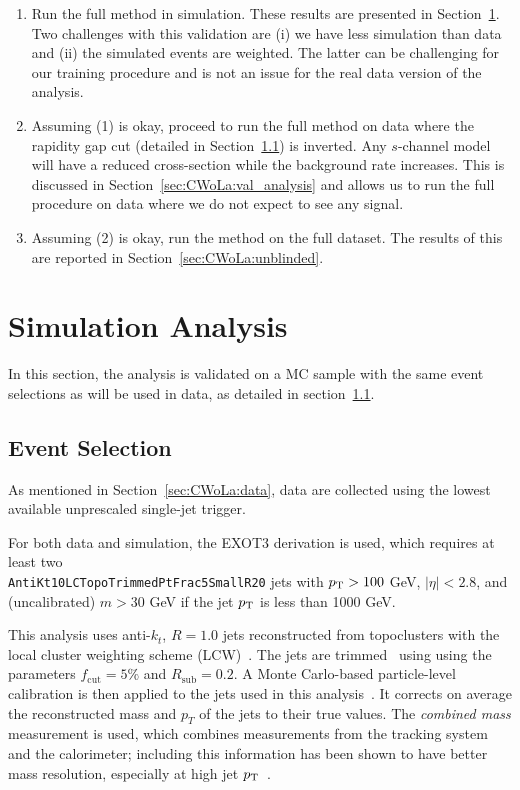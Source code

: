 \begin{enumerate}
\item Run the full method in simulation.  These results are presented in Section~\ref{sec:CWoLa:simulation_analysis}.  Two challenges with this validation are (i) we have less simulation than data and (ii) the simulated events are weighted.  The latter can be challenging for our training procedure and is not an issue for the real data version of the analysis. 
\item Assuming (1) is okay, proceed to run the full method on data where the rapidity gap cut (detailed in Section~\ref{sec:CWoLa:eventselection}) is inverted.  Any $s$-channel model will have a reduced cross-section while the background rate increases.  This is discussed in Section~\ref{sec:CWoLa:val_analysis} and allows us to run the full procedure on data where we do not expect to see any signal.
\item Assuming (2) is okay, run the method on the full dataset.  The results of this are reported in Section~\ref{sec:CWoLa:unblinded}.
\end{enumerate}

\clearpage

\section{Simulation Analysis}
\label{sec:CWoLa:simulation_analysis}
In this section, the analysis is validated on a MC sample with the same event selections as will be used in data, as detailed in section~\ref{sec:CWoLa:eventselection}.

\subsection{Event Selection}
\label{sec:CWoLa:eventselection}
As mentioned in Section~\ref{sec:CWoLa:data}, data are collected using the lowest available unprescaled single-jet trigger.

For both data and simulation, the EXOT3 derivation is used, which requires at least two \\ \texttt{AntiKt10LCTopoTrimmedPtFrac5SmallR20} jets with $p_{\text{T}}>100$ GeV, $|\eta|<2.8$, and (uncalibrated) $m>30$ GeV if the jet $p_{\text{T}}$ is less than 1000 GeV.

This analysis uses anti-$k_t$, $R=1.0$ jets reconstructed from topoclusters with the local cluster weighting scheme (LCW)~\cite{Aad:2016upy}. The jets are trimmed~\cite{Krohn:2009th} using using the parameters $f_\text{cut} = 5\%$ and $R_\text{sub} = 0.2$.
A Monte Carlo-based particle-level calibration is then applied to the jets used in this analysis~\cite{Aaboud:2018kfi}.
It corrects on average the reconstructed mass and $p_T$ of the jets to their true values.
The \textit{combined mass} measurement is used, which combines measurements from the tracking system and the calorimeter; including this information has been shown to have better mass resolution, especially at high jet $p_{\text{T}}$~\cite{ATLAS-CONF-2016-035}.

